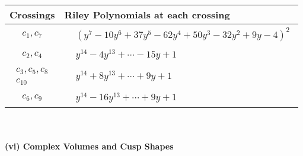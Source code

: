 \documentclass[1p]{elsarticle_modified}
\theoremstyle{definition}
\begin{document}
\begin{tabular}{m{50pt}|m{274pt}}
Crossings & \hspace{64pt}Riley Polynomials at each crossing \\
\hline $$\begin{aligned}c_{1},c_{7}\end{aligned}$$&$\begin{aligned}
&(y^7-10 y^6+37 y^5-62 y^4+50 y^3-32 y^2+9 y-4)^2
\end{aligned}$\\
\hline $$\begin{aligned}c_{2},c_{4}\end{aligned}$$&$\begin{aligned}
&y^{14}-4 y^{13}+\cdots-15 y+1
\end{aligned}$\\
\hline $$\begin{aligned}c_{3},c_{5},c_{8}\\c_{10}\end{aligned}$$&$\begin{aligned}
&y^{14}+8 y^{13}+\cdots+9 y+1
\end{aligned}$\\
\hline $$\begin{aligned}c_{6},c_{9}\end{aligned}$$&$\begin{aligned}
&y^{14}-16 y^{13}+\cdots+9 y+1
\end{aligned}$\\
\hline
\end{tabular}\\~\\
\newpage\flushleft \textbf{(vi) Complex Volumes and Cusp Shapes}
\end{document}
